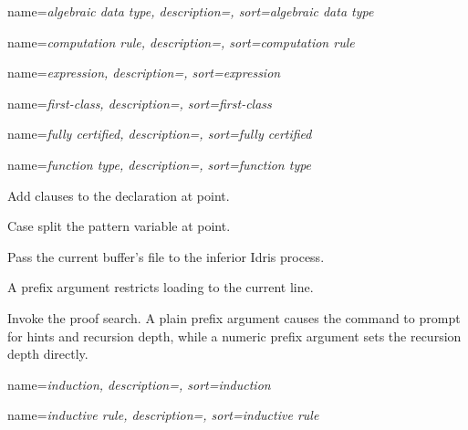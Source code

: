 {
  name=\sl{algebraic data type},
  description={},
  sort={algebraic data type}
}

{
  name=\sl{computation rule},
  description={},
  sort={computation rule}
}

{
  name=\sl{expression},
  description={},
  sort={expression}
}

{
  name=\sl{first-class},
  description={},
  sort={first-class}
}

{
  name=\sl{fully certified},
  description={},
  sort={fully certified}
}

{
  name=\sl{function type},
  description={},
  sort={function type}
}

{

  Add clauses to the declaration at point.
}

{

  Case split the pattern variable at point.
}

{

  Pass the current buffer’s file to the inferior Idris process.

  A prefix argument restricts loading to the current line.
}

{

  Invoke the proof search. A plain prefix argument causes the
  command to prompt for hints and recursion depth, while a numeric
  prefix argument sets the recursion depth directly.
}

{
  name=\sl{induction},
  description={},
  sort={induction}
}

{
  name=\sl{inductive rule},
  description={},
  sort={inductive rule}
}

